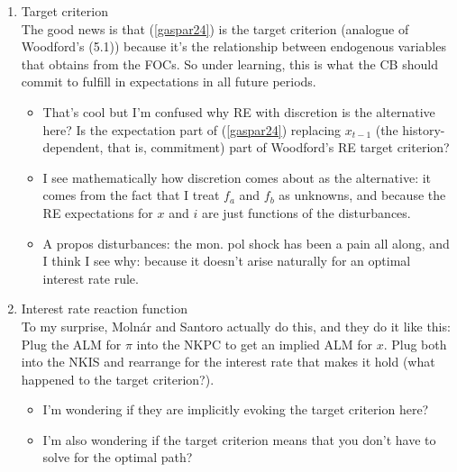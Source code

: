 \documentclass[11pt]{article}
\renewcommand{\[}{\begin{equation}}
\renewcommand{\]}{\end{equation}}
\begin{document}
\begin{enumerate}
\item Target criterion \\
The good news is that (\ref{gaspar24}) is the target criterion (analogue of Woodford's (5.1)) because it's the relationship between endogenous variables that obtains from the FOCs. So under learning, this is what the CB should commit to fulfill in expectations in all future periods. 
\begin{itemize}
\item That's cool but I'm confused why RE with discretion is the alternative here? Is the expectation part of (\ref{gaspar24}) replacing $x_{t-1}$ (the history-dependent, that is, commitment) part of Woodford's RE target criterion?
\item I see mathematically how discretion comes about as the alternative: it comes from the fact that I treat $f_a$ and $f_b$ as unknowns, and because the RE expectations for $x$ and $i$ are just functions of the disturbances.
\item A propos disturbances: the mon. pol shock has been a pain all along, and I think I see why: because it doesn't arise naturally for an optimal interest rate rule.
\end{itemize}
\item Interest rate reaction function \\
To my surprise, Moln\'ar and Santoro actually do this, and they do it like this: Plug the ALM for $\pi$ into the NKPC to get an implied ALM for $x$. Plug both into the NKIS and rearrange for the interest rate that makes it hold (what happened to the target criterion?).
\begin{itemize}
\item I'm wondering if they are implicitly evoking the target criterion here?
\item I'm also wondering if the target criterion means that you don't have to solve for the optimal path?
\end{itemize}

\end{enumerate}
\end{document}
